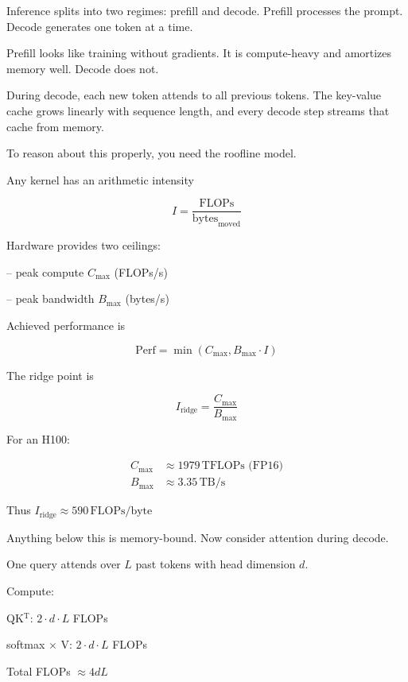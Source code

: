\documentclass[12pt]{article}
\begin{document}
Inference splits into two regimes: prefill and decode. Prefill processes the prompt. Decode generates one token at a time.

Prefill looks like training without gradients. It is compute-heavy and amortizes memory well. Decode does not.

During decode, each new token attends to all previous tokens. The key-value cache grows linearly with sequence length, and every decode step streams that cache from memory.

To reason about this properly, you need the roofline model.

Any kernel has an arithmetic intensity

\begin{equation}
I = \frac{\text{FLOPs}}{\text{bytes}_\text{moved}}
\end{equation}

Hardware provides two ceilings:

-- peak compute $C_\text{max}$ (FLOPs/s)

-- peak bandwidth $B_\text{max}$ (bytes/s)

Achieved performance is

\begin{equation}
\text{Perf} = \min(C_\text{max}, B_\text{max} \cdot I)
\end{equation}

The ridge point is

\begin{equation}
I_\text{ridge} = \frac{C_\text{max}}{B_\text{max}}
\end{equation}

For an H100:

\begin{align*}
C_\text{max} &\approx 1979 \, \text{TFLOPs (FP16)} \\
B_\text{max} &\approx 3.35 \, \text{TB/s}
\end{align*}

Thus $I_\text{ridge} \approx 590 \, \text{FLOPs/byte}$

Anything below this is memory-bound. Now consider attention during decode.

One query attends over $L$ past tokens with head dimension $d$.

Compute:

QK$^\text{T}$: $2 \cdot d \cdot L$ FLOPs

softmax $\times$ V: $2 \cdot d \cdot L$ FLOPs

Total FLOPs $\approx 4 d L$
\end{document}
